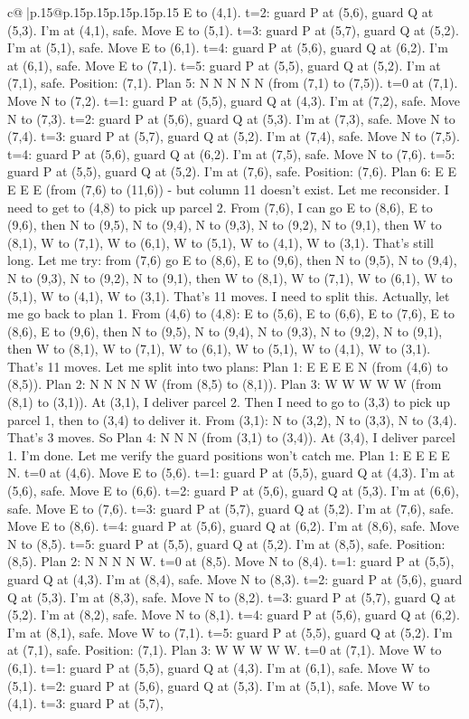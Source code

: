 \documentclass{article}
\begin{document}
{\begin{supertabular}{c@{$\;$}|p{.15\linewidth}@{}p{.15\linewidth}p{.15\linewidth}p{.15\linewidth}p{.15\linewidth}p{.15\linewidth}}
{{{E to (4,1). t=2: guard P at (5,6), guard Q at (5,3). I'm at (4,1), safe. Move E to (5,1). t=3: guard P at (5,7), guard Q at (5,2). I'm at (5,1), safe. Move E to (6,1). t=4: guard P at (5,6), guard Q at (6,2). I'm at (6,1), safe. Move E to (7,1). t=5: guard P at (5,5), guard Q at (5,2). I'm at (7,1), safe. Position: (7,1). Plan 5: N N N N N (from (7,1) to (7,5)). t=0 at (7,1). Move N to (7,2). t=1: guard P at (5,5), guard Q at (4,3). I'm at (7,2), safe. Move N to (7,3). t=2: guard P at (5,6), guard Q at (5,3). I'm at (7,3), safe. Move N to (7,4). t=3: guard P at (5,7), guard Q at (5,2). I'm at (7,4), safe. Move N to (7,5). t=4: guard P at (5,6), guard Q at (6,2). I'm at (7,5), safe. Move N to (7,6). t=5: guard P at (5,5), guard Q at (5,2). I'm at (7,6), safe. Position: (7,6). Plan 6: E E E E E (from (7,6) to (11,6)) {-} but column 11 doesn't exist. Let me reconsider. I need to get to (4,8) to pick up parcel 2. From (7,6), I can go E to (8,6), E to (9,6), then N to (9,5), N to (9,4), N to (9,3), N to (9,2), N to (9,1), then W to (8,1), W to (7,1), W to (6,1), W to (5,1), W to (4,1), W to (3,1). That's still long. Let me try: from (7,6) go E to (8,6), E to (9,6), then N to (9,5), N to (9,4), N to (9,3), N to (9,2), N to (9,1), then W to (8,1), W to (7,1), W to (6,1), W to (5,1), W to (4,1), W to (3,1). That's 11 moves. I need to split this. Actually, let me go back to plan 1. From (4,6) to (4,8): E to (5,6), E to (6,6), E to (7,6), E to (8,6), E to (9,6), then N to (9,5), N to (9,4), N to (9,3), N to (9,2), N to (9,1), then W to (8,1), W to (7,1), W to (6,1), W to (5,1), W to (4,1), W to (3,1). That's 11 moves. Let me split into two plans: Plan 1: E E E E N (from (4,6) to (8,5)). Plan 2: N N N N W (from (8,5) to (8,1)). Plan 3: W W W W W (from (8,1) to (3,1)). At (3,1), I deliver parcel 2. Then I need to go to (3,3) to pick up parcel 1, then to (3,4) to deliver it. From (3,1): N to (3,2), N to (3,3), N to (3,4). That's 3 moves. So Plan 4: N N N (from (3,1) to (3,4)). At (3,4), I deliver parcel 1. I'm done. Let me verify the guard positions won't catch me. Plan 1: E E E E N. t=0 at (4,6). Move E to (5,6). t=1: guard P at (5,5), guard Q at (4,3). I'm at (5,6), safe. Move E to (6,6). t=2: guard P at (5,6), guard Q at (5,3). I'm at (6,6), safe. Move E to (7,6). t=3: guard P at (5,7), guard Q at (5,2). I'm at (7,6), safe. Move E to (8,6). t=4: guard P at (5,6), guard Q at (6,2). I'm at (8,6), safe. Move N to (8,5). t=5: guard P at (5,5), guard Q at (5,2). I'm at (8,5), safe. Position: (8,5). Plan 2: N N N N W. t=0 at (8,5). Move N to (8,4). t=1: guard P at (5,5), guard Q at (4,3). I'm at (8,4), safe. Move N to (8,3). t=2: guard P at (5,6), guard Q at (5,3). I'm at (8,3), safe. Move N to (8,2). t=3: guard P at (5,7), guard Q at (5,2). I'm at (8,2), safe. Move N to (8,1). t=4: guard P at (5,6), guard Q at (6,2). I'm at (8,1), safe. Move W to (7,1). t=5: guard P at (5,5), guard Q at (5,2). I'm at (7,1), safe. Position: (7,1). Plan 3: W W W W W. t=0 at (7,1). Move W to (6,1). t=1: guard P at (5,5), guard Q at (4,3). I'm at (6,1), safe. Move W to (5,1). t=2: guard P at (5,6), guard Q at (5,3). I'm at (5,1), safe. Move W to (4,1). t=3: guard P at (5,7), }}}
\end{supertabular}}
\end{document}
